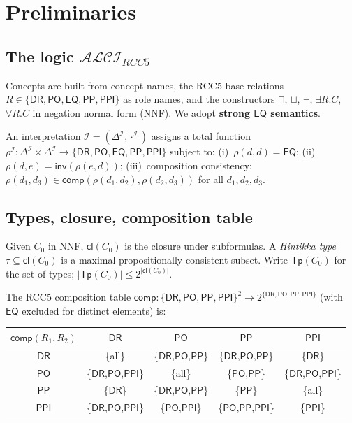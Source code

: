 \documentclass[a4paper,11pt]{article}
\theoremstyle{definition}
\newcommand{\ALCIRCC}[1]{\ensuremath{\mathcal{ALCI}_{\mathit{RCC#1}}}}
\newcommand{\DR}{\ensuremath{\mathsf{DR}}}
\newcommand{\PO}{\ensuremath{\mathsf{PO}}}
\newcommand{\EQ}{\ensuremath{\mathsf{EQ}}}
\newcommand{\PP}{\ensuremath{\mathsf{PP}}}
\newcommand{\PPI}{\ensuremath{\mathsf{PPI}}}
\newcommand{\inv}{\ensuremath{\mathsf{inv}}}
\newcommand{\comp}{\ensuremath{\mathsf{comp}}}
\newcommand{\cl}{\ensuremath{\mathsf{cl}}}
\newcommand{\Tp}{\ensuremath{\mathsf{Tp}}}
\newcommand{\interp}{\ensuremath{\mathcal{I}}}
\newcommand{\DeltaI}{\ensuremath{\Delta^{\mathcal{I}}}}
\begin{document}
\section{Preliminaries}\label{sec:prelim}

\subsection{The logic $\ALCIRCC{5}$}

Concepts are built from concept names, the RCC5 base relations
$R \in \{\DR, \PO, \EQ, \PP, \PPI\}$ as role names, and the
constructors $\sqcap$, $\sqcup$, $\neg$, $\exists R.C$,
$\forall R.C$ in negation normal form (NNF).  We adopt
\textbf{strong $\EQ$ semantics}.

An interpretation $\interp = (\DeltaI, \cdot^{\interp})$ assigns a
total function $\rho^{\interp}: \DeltaI \times \DeltaI \to
\{\DR, \PO, \EQ, \PP, \PPI\}$ subject to: (i)~$\rho(d,d) = \EQ$;
(ii)~$\rho(d,e) = \inv(\rho(e,d))$; (iii)~composition consistency:
$\rho(d_1, d_3) \in \comp(\rho(d_1, d_2), \rho(d_2, d_3))$ for all
$d_1, d_2, d_3$.

\subsection{Types, closure, composition table}

Given $C_0$ in NNF, $\cl(C_0)$ is the closure under subformulas.
A \emph{Hintikka type} $\tau \subseteq \cl(C_0)$ is a maximal
propositionally consistent subset.  Write $\Tp(C_0)$ for the set of
types; $|\Tp(C_0)| \le 2^{|\cl(C_0)|}$.

The RCC5 composition table
$\comp: \{\DR,\PO,\PP,\PPI\}^2 \to 2^{\{\DR,\PO,\PP,\PPI\}}$ (with
$\EQ$ excluded for distinct elements) is:

\begin{center}
\renewcommand{\arraystretch}{1.15}
\begin{tabular}{c|cccc}
$\comp(R_1, R_2)$ & $\DR$ & $\PO$ & $\PP$ & $\PPI$ \\
\hline
$\DR$ & \{all\} & \{\DR,\PO,\PP\} & \{\DR,\PO,\PP\} & \{\DR\} \\
$\PO$ & \{\DR,\PO,\PPI\} & \{all\} & \{\PO,\PP\} & \{\DR,\PO,\PPI\} \\
$\PP$ & \{\DR\} & \{\DR,\PO,\PP\} & \{\PP\} & \{all\} \\
$\PPI$ & \{\DR,\PO,\PPI\} & \{\PO,\PPI\} & \{\PO,\PP,\PPI\} & \{\PPI\} \\
\end{tabular}
\end{center}
\end{document}
